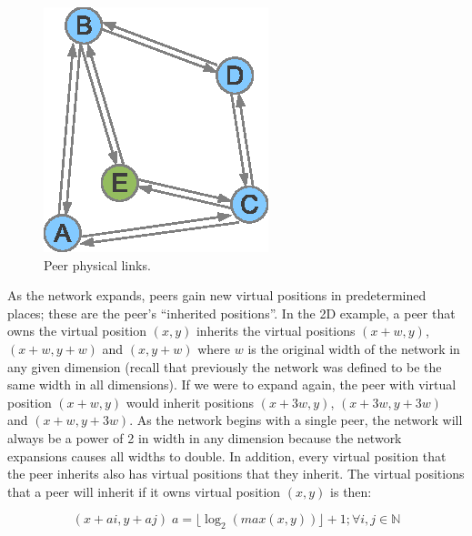 \documentclass[ %
                    author={Luke Murray},
                supervisor={Dr. Simon Hollis},
                     title={Shadow Peer-to-Peer Networks},
                  subtitle={},
                    degree={MEng},
                      year={2013} ]{thesis}
\begin{document}
\begin{figure}[h]
\begin{minipage}[b]{0.35\linewidth}
        \includegraphics[width=\linewidth]{diagrams/network_join2.eps}
        \caption{Peer physical links.}
        \label{join2}
    \end{minipage}
\end{figure}

As the network expands, peers gain new virtual positions in predetermined places; these are the peer's ``inherited positions''. In the 2D example, a peer that owns the virtual position $(x, y)$ inherits the virtual positions $(x + w, y)$, $(x + w, y + w)$ and $(x, y + w)$ where $w$ is the original width of the network in any given dimension (recall that previously the network was defined to be the same width in all dimensions). If we were to expand again, the peer with virtual position $(x + w, y)$ would inherit positions $(x + 3w, y)$, $(x + 3w, y + 3w)$ and $(x + w, y + 3w)$. As the network begins with a single peer, the network will always be a power of 2 in width in any dimension because the network expansions causes all widths to double. In addition, every virtual position that the peer inherits also has virtual positions that they inherit. The virtual positions that a peer will inherit if it owns virtual position $(x, y)$ is then:

\[(x + ai, y + aj)\; a = \lfloor \log_{2}{(max(x,y))} \rfloor + 1; \forall i,j \in \mathbb{N}\]
\end{document}
